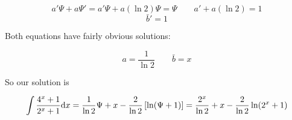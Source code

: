 $$a'\Psi + a\Psi' = a'\Psi + a(\ln 2)\Psi = \Psi \qquad a' + a(\ln 2) = 1$$
$$\bar{b}' = 1$$

Both equations have fairly obvious solutions:

$$a = \frac{1}{\ln 2} \qquad \bar{b}=x$$

So our solution is

$$\int {{4^x+1}\over{2^x+1}} {\rm d}x = \frac{1}{\ln 2}\Psi + x  - \frac{2}{\ln 2}\left[\ln(\Psi+1)\right] =
\frac{2^x}{\ln 2} + x - \frac{2}{\ln 2}\ln(2^x+1) $$

\endexample


\begin{comment}
\vfill\eject

Consider an irreducible factor $F$ that appears both as a factor of $A$
and also in $q$'s denominator, with
multiplicity $m \ge 1 $, so $q = N/(F^m D)$, and we rewrite the Risch equation:

$$A F q' - B q = C$$

$$A F \frac{N' F D - m N F' D - N F D'}{F^{m+1} D^2} - B \frac{N}{F^m D} = C$$

$$A F N' D - m A F' N D - A F N D' - B N D = C D^2 F^{m}$$

$$ - m A F' N D - B N D  = C D^2 F^{m} - A F N' D + A F N D'$$

$$ - (m A F' - B ) N D  = F (C D^2 F^{m-1} - A N' D - A N D')$$

Now, the right hand side of this equation is a multiple of $F$, so the
left hand side must also be a multiple of $F$.  However, $F$ is
irreducible and is relatively prime to both $N$ and $D$, so the only way
the left hand side can be a multiple of $F$ is if $m A F' - B$ is a
multiple of $F$.

Why?  All of these variables
are polynomials in ${\mathbb C}[x]$, so this equation is an equality
between polynomials.  Because ${\mathbb C}[x]$ is a {\it unique factorization domain}, its
polynomials can factor in essentially one way only, so if $F$ factors
the right hand side, it must also factor the left.  If $F$ were not
irreducible, then it might have two factors, one contributed by $N$
and the other contributed by $D$.  It's the irreducibility of $F$,
the unique factorization of polynomials in ${\mathbb C}[x]$, and
our assumption that $N$ and $D$ are relatively prime to $F$
that makes this argument work.

The simplest way to enforce this factorization requirement is to use
the resultant (Theorem \ref{resultant theorem}):

$${\rm res}_x(m A F' - B, F) = 0$$

We calculate this resultant for each irreducible factor $F$ of $A$,
and this gives us $m$, the power to which $F$ appears in $q$'s
denominator.  If this resultant equation has no positive integer
solution, then $F$ can not appear at all in $q$'s denominator.

\end{comment}
